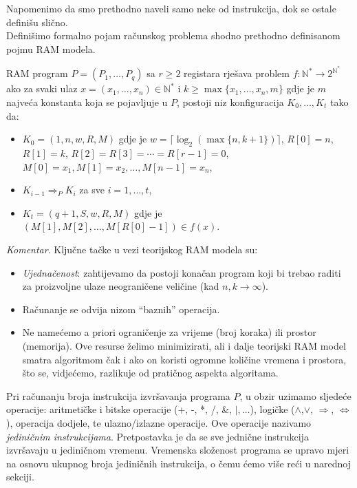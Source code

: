 Napomenimo da smo prethodno naveli   samo neke od instrukcija, dok se ostale definišu slično. \\


Definišimo formalno pojam računskog problema shodno prethodno definisanom pojmu RAM modela. 
\begin{definition}
	 RAM program $P = (P_1, \ldots, P_q)$ sa $r \geq 2$ registara rješava problem $f \colon \mathbb{N}^* \rightarrow 2^{\mathbb{N}^* } $
	ako za svaki ulaz $x = (x_1,\ldots, x_n) \in \mathbb{N}^* $ i $k \geq \max\{x_1,\ldots, x_n, m\}$ gdje je $m$ najveća konstanta koja se pojavljuje u $P$, postoji niz konfiguracija $K_0,\ldots,K_t$ tako da:
	\begin{itemize}
		\item $K_0 = (1, n, w, R, M)$ gdje je $w = \lceil \log_2(\max\{n, k +1\})\rceil$, $R[0] = n$, $R[1] = k$, $R[2] = R[3] = \cdots =  R[r-1] = 0$, $M[0] = x_1,
		M[1] = x_2, \ldots , M[n - 1] = x_n$,
		\item $K_{i-1} \Rightarrow_P K_i $ za sve $i = 1, \ldots ,t$,
		\item $K_t = (q+1, S, w, R, M)$ gdje je $(M[1], M[2], \ldots , M[R[0] - 1]) \in  f (x)$. 
	\end{itemize}
\end{definition}

\textit{Komentar}.  Ključne tačke u vezi teorijskog RAM modela su:
\begin{itemize}
	\item  \textit{Ujednačenost}: zahtijevamo da postoji konačan program koji bi trebao raditi za proizvoljne ulaze neograničene veličine
(kad $n, k \rightarrow \infty$).
    \item Računanje se odvija nizom “baznih” operacija.
    \item Ne namećemo a priori ograničenje za vrijeme (broj koraka) ili prostor   (memorija). Ove resurse 
      želimo minimizirati, ali i dalje teorijski RAM model  smatra  algoritmom čak i ako on koristi ogromne količine vremena i prostora, što se, vidjećemo, razlikuje od pratičnog aspekta algoritama. 
\end{itemize}

Pri računanju broja instrukcija izvršavanja programa $P$, u obzir uzimamo sljedeće operacije: aritmetičke i bitske operacije (+, -, *, /, \&, $\mid,\ldots $), logičke ($\wedge$,$\vee$, $\Rightarrow$, $\Leftrightarrow$), operacija dodjele, te ulazno/izlazne operacije. Ove operacije nazivamo \textit{jediničnim instrukcijama}.  Pretpostavka je da se sve jednične instrukcija izvršavaju u jediničnom vremenu.  Vremenska složenost programa se upravo mjeri na osnovu ukupnog broja jediničnih instrukcija, o čemu ćemo više reći u narednoj sekciji. 

